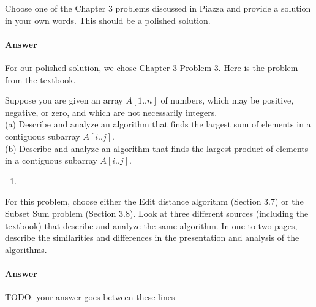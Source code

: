 \documentclass{article}
\begin{document}

\nextprob
{}

Choose one of the Chapter 3 problems discussed in Piazza and provide a solution
in your own words.  This should be a polished solution.

\paragraph{Answer}

For our polished solution, we chose Chapter 3 Problem 3.
Here is the problem from the textbook.

Suppose you are given an array $A[1 .. n]$ of numbers, which may be positive, negative, or zero, and which are not necessarily integers. \\
(a) Describe and analyze an algorithm that finds the largest sum of elements in a contiguous subarray $A[i .. j]$. \\
(b) Describe and analyze an algorithm that finds the largest product of elements in a contiguous subarray $A[i .. j]$.

\begin{enumerate}
    \item 
\end{enumerate}


\nextprob
{}

For this problem, choose either the Edit distance algorithm (Section 3.7) or the
Subset Sum problem (Section 3.8). Look at three different sources (including the
textbook) that describe
and analyze the same algorithm. In one to two pages, describe the similarities
and differences in the presentation and analysis of the algorithms.

\paragraph{Answer}


TODO: your answer goes between these lines

\end{document}

